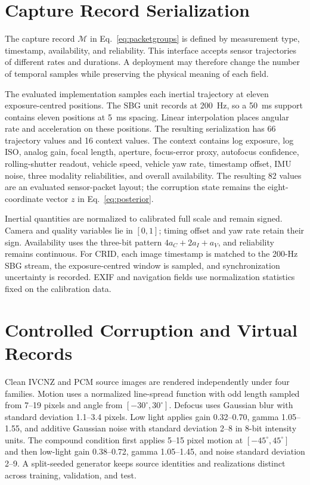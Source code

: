 \documentclass[journal]{IEEEtran}
\begin{document}
\section{Capture Record Serialization}
\label{sup:packet}
The capture record $\mathcal{M}$ in Eq.~\eqref{eq:packetgroups} is defined by measurement type, timestamp, availability, and reliability. This interface accepts sensor trajectories of different rates and durations. A deployment may therefore change the number of temporal samples while preserving the physical meaning of each field.

The evaluated implementation samples each inertial trajectory at eleven exposure-centred positions. The SBG unit records at 200~Hz, so a 50~ms support contains eleven positions at 5~ms spacing. Linear interpolation places angular rate and acceleration on these positions. The resulting serialization has 66 trajectory values and 16 context values. The context contains log exposure, log ISO, analog gain, focal length, aperture, focus-error proxy, autofocus confidence, rolling-shutter readout, vehicle speed, vehicle yaw rate, timestamp offset, IMU noise, three modality reliabilities, and overall availability. The resulting 82 values are an evaluated sensor-packet layout; the corruption state remains the eight-coordinate vector $z$ in Eq.~\eqref{eq:posterior}.

Inertial quantities are normalized to calibrated full scale and remain signed. Camera and quality variables lie in $[0,1]$; timing offset and yaw rate retain their sign. Availability uses the three-bit pattern $4a_C+2a_I+a_V$, and reliability remains continuous. For CRID, each image timestamp is matched to the 200-Hz SBG stream, the exposure-centred window is sampled, and synchronization uncertainty is recorded. EXIF and navigation fields use normalization statistics fixed on the calibration data.

\section{Controlled Corruption and Virtual Records}
\label{sup:controlled_generation}
Clean IVCNZ and PCM source images are rendered independently under four families. Motion uses a normalized line-spread function with odd length sampled from 7--19 pixels and angle from $[-30^\circ,30^\circ]$. Defocus uses Gaussian blur with standard deviation 1.1--3.4 pixels. Low light applies gain 0.32--0.70, gamma 1.05--1.55, and additive Gaussian noise with standard deviation 2--8 in 8-bit intensity units. The compound condition first applies 5--15 pixel motion at $[-45^\circ,45^\circ]$ and then low-light gain 0.38--0.72, gamma 1.05--1.45, and noise standard deviation 2--9. A split-seeded generator keeps source identities and realizations distinct across training, validation, and test.
\end{document}
